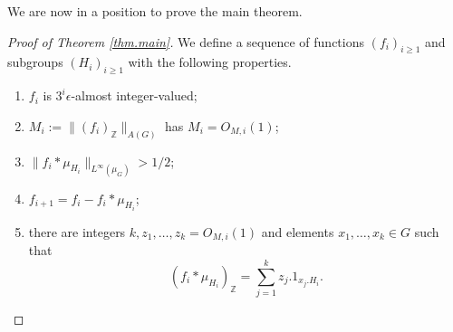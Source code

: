 \documentclass[12pt]{amsart}
\numberwithin{equation}{section}
\theoremstyle{plain}
\theoremstyle{definition}
\renewcommand{\geq}{\geqslant}
\newcommand{\Z}{\mathbb{Z}}
\begin{document}
We are now in a position to prove the main theorem.
\begin{proof}[Proof of Theorem \ref{thm.main}]
We define a sequence of functions $(f_i)_{i\geq 1}$ and subgroups $(H_i)_{i\geq 1}$ with the following properties.
\begin{enumerate}
\item \label{pty.00} $f_i$ is $3^i\epsilon $-almost integer-valued;
\item \label{pty.01} $M_i:=\|(f_i)_\Z\|_{A(G)}$ has $M_i=O_{M,i}(1)$;
\item \label{pty.02} $\|f_i \ast \mu_{H_i}\|_{L^\infty(\mu_G)} >1/2$;
\item \label{pty.03} $f_{i+1} =f_i - f_i \ast \mu_{H_i}$;
\item \label{pty.04} there are integers $k,z_1,\dots,z_k = O_{M,i}(1)$ and elements $x_1,\dots,x_k \in G$ such that\begin{equation*}
(f_{i} \ast \mu_{H_i})_\Z = \sum_{j=1}^k{z_j.1_{x_j.H_i}}.
\end{equation*}
\end{enumerate}


\end{proof}
\end{document}
